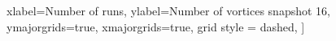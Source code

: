 		xlabel={Number of runs},
		ylabel={Number of vortices snapshot 16},
		ymajorgrids=true,
		xmajorgrids=true,
		grid style = dashed,
		]
